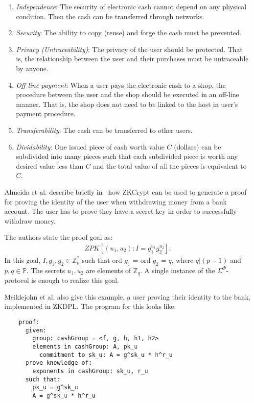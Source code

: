 \documentclass{sig-alternate}
\begin{document}
	\begin{enumerate}
		\item \textit{Independence}: The security of electronic cash cannot depend on any
		physical condition. Then the cash can be transferred through networks.
		
		\item \textit{Security}: The ability to copy (reuse) and forge the cash must be
		prevented.
		
		\item \textit{Privacy (Untraceability)}: The privacy of the user should be
		protected. That is, the relationship between the user and their purchases must
		be untraceable by anyone.
		
		\item \textit{Off-line payment}: When a user pays the electronic cash to a shop, 
		the procedure between the user and the shop should be executed in an off-line
		manner. That is, the shop does not need to be linked to the host in user's
		payment procedure.
		
		\item \textit{Transferability}: The cash can be transferred to other users.
		
		\item \textit{Dividability}: One issued piece of cash worth value $C$ (dollars)
		can be subdivided into many pieces such that each subdivided piece is worth any
		desired value less than $C$ and the total value of all the pieces is equivalent
		to $C$.
	\end{enumerate}
	
	Almeida et al. describe briefly in~\cite{ZKCrypt:2012} how ZKCrypt can be used to
	generate a proof for proving the identity of the user when withdrawing money from
	a bank account. The user has to prove they have a secret key in order to successfully
	withdraw money. 
	
	The authors state the proof goal as:
	\begin{align*}
	ZPK\left[(u_{1}, u_{2}): I = g^{u_{1}}_{1}g^{u_{2}}_{2}\right].
	\end{align*}
	In this goal, $I, g_{1}, g_{2} \in \mathbb{Z}^{*}_{p}$ such that ord $g_{1}$ = ord
	$g_{2}$ = $q$, where $q|(p - 1)$ and $p, q \in \mathbb{P}$. The secrets $u_{1}, u_{2}$
	are elements of $\mathbb{Z}_{q}$. A single instance of the $\Sigma^{\Phi}$-protocol
	is enough to realize this goal.
	
	Meiklejohn et al. also give this example, a user proving their identity to the bank,
	implemented in ZKDPL. The program for this looks like: 
	\begin{verbatim}
	proof:
	  given:
	  	group: cashGroup = <f, g, h, h1, h2>
	  	elements in cashGroup: A, pk_u
	  	  commitment to sk_u: A = g^sk_u * h^r_u
	  prove knowledge of:
	  	exponents in cashGroup: sk_u, r_u
	  such that:
	  	pk_u = g^sk_u
	  	A = g^sk_u * h^r_u
	\end{verbatim}
	
\end{document}
